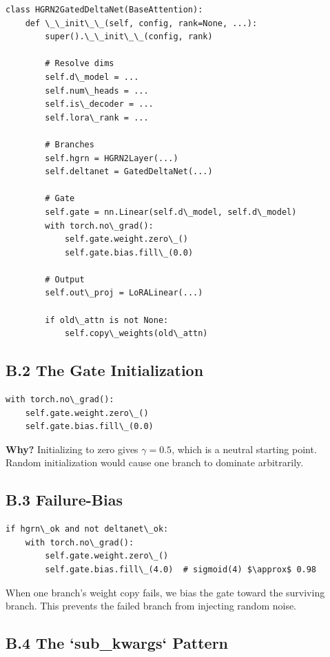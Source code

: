 \begin{lstlisting}
class HGRN2GatedDeltaNet(BaseAttention):
    def \_\_init\_\_(self, config, rank=None, ...):
        super().\_\_init\_\_(config, rank)
        
        # Resolve dims
        self.d\_model = ...
        self.num\_heads = ...
        self.is\_decoder = ...
        self.lora\_rank = ...
        
        # Branches
        self.hgrn = HGRN2Layer(...)
        self.deltanet = GatedDeltaNet(...)
        
        # Gate
        self.gate = nn.Linear(self.d\_model, self.d\_model)
        with torch.no\_grad():
            self.gate.weight.zero\_()
            self.gate.bias.fill\_(0.0)
        
        # Output
        self.out\_proj = LoRALinear(...)
        
        if old\_attn is not None:
            self.copy\_weights(old\_attn)
\end{lstlisting}

\subsection{B.2 The Gate Initialization}

\begin{lstlisting}
with torch.no\_grad():
    self.gate.weight.zero\_()
    self.gate.bias.fill\_(0.0)
\end{lstlisting}

\textbf{Why?} Initializing to zero gives $\gamma = 0.5$, which is a neutral 
starting point. Random initialization would cause one branch to dominate 
arbitrarily.

\subsection{B.3 Failure-Bias}

\begin{lstlisting}
if hgrn\_ok and not deltanet\_ok:
    with torch.no\_grad():
        self.gate.weight.zero\_()
        self.gate.bias.fill\_(4.0)  # sigmoid(4) $\approx$ 0.98
\end{lstlisting}

When one branch's weight copy fails, we bias the gate toward the surviving 
branch. This prevents the failed branch from injecting random noise.

\subsection{B.4 The `sub\_kwargs` Pattern}

